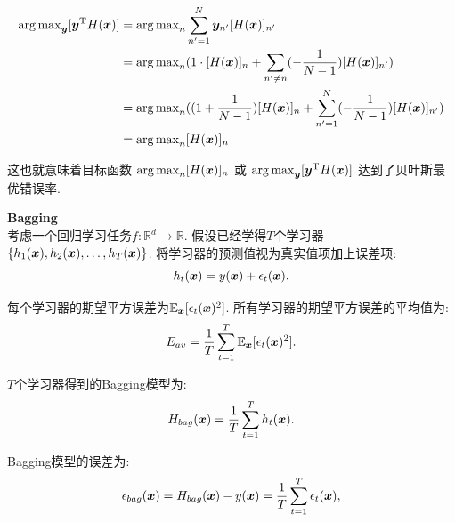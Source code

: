 \documentclass[answers]{exam}  %
\begin{document}
\begin{questions}
\begin{solution}
\begin{enumerate}
            $$
              \begin{aligned}
                \operatorname{arg\,max}_{\bm{y}}[\bm{y}^{\mathrm{T}}H(\bm{x})] & = \operatorname{arg\,max}_{n}\sum_{n'=1}^{N}\bm{y}_{n'}[H(\bm{x})]_{n'}                                             \\
                                                               & = \operatorname{arg\,max}_{n}(1 \cdot [H(\bm{x})]_{n} + \sum_{n'\neq n}(-\frac{1}{N-1})[H(\bm{x})]_{n'})            \\
                                                               & = \operatorname{arg\,max}_{n}((1+\frac{1}{N-1})[H(\bm{x})]_{n} + \sum_{n' = 1}^{N}(-\frac{1}{N-1})[H(\bm{x})]_{n'}) \\
                                                               & = \operatorname{arg\,max}_{n} [H(\bm{x})]_{n}                                                                       \\
              \end{aligned}
            $$

            这也就意味着目标函数 $\operatorname{arg\,max}_{n}[H(\bm{x})]_{n}$ 或 $\operatorname{arg\,max}_{\bm{y}}[\bm{y}^{\mathrm{T}}H(\bm{x})]$ 达到了贝叶斯最优错误率.
    \end{enumerate}
  \end{solution}

  \question [20] \textbf{Bagging} \\
  考虑一个回归学习任务$f:\mathbb{R}^d \rightarrow \mathbb{R}$. 假设已经学得$T$个学习器$\{h_1({\boldsymbol{x}}), h_2({\boldsymbol{x}}), \dots, h_T({\boldsymbol{x}})\}$. 将学习器的预测值视为真实值项加上误差项:
  \begin{equation}
    h_t({\boldsymbol{x}})=y({\boldsymbol{x}})+\epsilon_t({\boldsymbol{x}}).
  \end{equation}

  每个学习器的期望平方误差为$\mathbb{E}_{{\boldsymbol{x}}}[\epsilon_t({\boldsymbol{x}})^2]$. 所有学习器的期望平方误差的平均值为:
  \begin{equation}
    E_{av}=\frac{1}{T}\sum_{t=1}^T \mathbb{E}_{{\boldsymbol{x}}}[\epsilon_t({\boldsymbol{x}})^2].
  \end{equation}

  $T$个学习器得到的Bagging模型为:
  \begin{equation}
    H_{bag}({\boldsymbol{x}})=\frac{1}{T}\sum_{t=1}^T h_t({\boldsymbol{x}}).
  \end{equation}

  Bagging模型的误差为:
  \begin{equation}
    \epsilon_{bag}({\boldsymbol{x}})=H_{bag}({\boldsymbol{x}})-y({\boldsymbol{x}})=\frac{1}{T}\sum_{t=1}^T \epsilon_t({\boldsymbol{x}}),
  \end{equation}


\end{questions}
\end{document}
